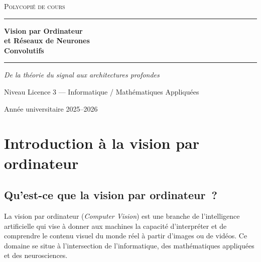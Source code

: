 \documentclass[a4paper,11pt,twoside]{book}
\begin{document}
\begin{titlepage}
\centering
\vspace*{3cm}

{\Large\scshape\color{accent} Polycopié de cours}

\vspace{1cm}
{\color{accent}\rule{\textwidth}{1.5pt}}
\vspace{0.8cm}

{\Huge\bfseries\color{primary} Vision par Ordinateur\\[0.4cm]
et Réseaux de Neurones\\[0.4cm]
Convolutifs}

\vspace{0.8cm}
{\color{accent}\rule{\textwidth}{1.5pt}}

\vspace{1.5cm}
{\Large\itshape\color{darkgray} De la théorie du signal aux architectures profondes}

\vspace{1cm}
{\large\color{accent} Niveau Licence 3 --- Informatique / Mathématiques Appliquées}

\vfill

{\large\color{darkgray} Année universitaire 2025--2026}
\end{titlepage}

\tableofcontents
\newpage

\chapter{Introduction à la vision par ordinateur}

\section{Qu'est-ce que la vision par ordinateur~?}

La vision par ordinateur (\textit{Computer Vision}) est une branche de l'intelligence artificielle qui vise à donner aux machines la capacité d'interpréter et de comprendre le contenu visuel du monde réel à partir d'images ou de vidéos. Ce domaine se situe à l'intersection de l'informatique, des mathématiques appliquées et des neurosciences.
\end{document}
